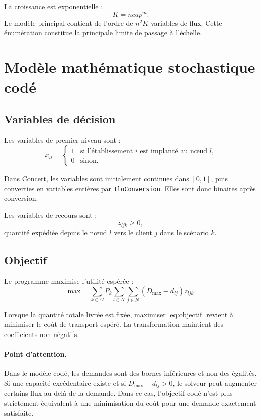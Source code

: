 \documentclass[11pt,a4paper]{article}
\newcommand{\code}[1]{\texttt{#1}}
\begin{document}
La croissance est exponentielle :
\[
K=ncap^m.
\]
Le modèle principal contient de l'ordre de $n^2K$ variables de flux. Cette
énumération constitue la principale limite de passage à l'échelle.

\section{Modèle mathématique stochastique codé}

\subsection{Variables de décision}

Les variables de premier niveau sont :
\[
x_{il}=
\begin{cases}
1 & \text{si l'établissement $i$ est implanté au nœud $l$,}\\
0 & \text{sinon.}
\end{cases}
\]

Dans Concert, les variables sont initialement continues dans $[0,1]$, puis
converties en variables entières par \code{IloConversion}. Elles sont donc
binaires après conversion.

Les variables de recours sont :
\[
z_{ljk}\geq 0,
\]
quantité expédiée depuis le nœud $l$ vers le client $j$ dans le scénario $k$.

\subsection{Objectif}

Le programme maximise l'utilité espérée :
\begin{equation}
\max\quad
\sum_{k\in\Omega}P_k
\sum_{l\in N}\sum_{j\in N}
(D_{\max}-d_{lj})z_{ljk}.
\label{eq:objectif}
\end{equation}

Lorsque la quantité totale livrée est fixée, maximiser
\eqref{eq:objectif} revient à minimiser le coût de transport espéré.
La transformation maintient des coefficients non négatifs.

\paragraph{Point d'attention.}
Dans le modèle codé, les demandes sont des bornes inférieures et non des
égalités. Si une capacité excédentaire existe et si
$D_{\max}-d_{lj}>0$, le solveur peut augmenter certains flux au-delà de la
demande. Dans ce cas, l'objectif codé n'est plus strictement équivalent à une
minimisation du coût pour une demande exactement satisfaite.
\end{document}
